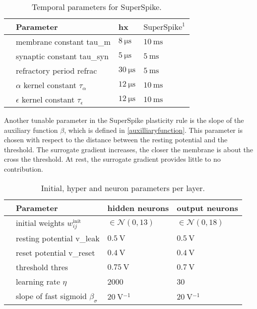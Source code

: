 \begin{table}[t!]\centering{}
	\begin{tabular}{@{}rlll@{}}\toprule
		& Parameter		& 	\gls{hx} & 	$\text{SuperSpike}^1$ \\ \midrule
		& membrane constant \gls{tau_m}		& 	$\SI{8}{\micro \s}$ & 	$\SI{10}{\milli \s}$\\
		& synaptic constant \gls{tau_syn}	&	$\SI{5}{\micro \s}$ & 	$\SI{5}{\milli \s}$\\
		& refractory period \gls{refrac}	&	$\SI{30}{\micro \s}$ & 	$\SI{5}{\milli \s}$\\
		& $\alpha$ kernel constant $\tau_\alpha$	&	$\SI{12}{\micro \s}$& 	$\SI{10}{\milli \s}$\\
		& $\epsilon$ kernel constant $\tau_\epsilon$ 	&	$\SI{12}{\micro \s}$& 	$\SI{10}{\milli \s}$\\
		\bottomrule
	\end{tabular}
	\caption[Temporal parameters for SuperSpike.]{Temporal parameters for SuperSpike.}
	\label{temporalconstants}
\end{table}

Another tunable parameter in the SuperSpike plasticity rule is the slope of the auxiliary function $\beta$, which is defined in \cref{auxilliaryfunction}. This parameter is chosen with respect to the distance between the resting potential and the threshold. The surrogate gradient increases, the closer the membrane is about the cross the threshold. At rest, the surrogate gradient provides little to no contribution. 

\begin{table}\centering{}
	\begin{tabular}{@{}rlll@{}}\toprule
		& Parameter								& 	hidden neurons 			& 	output neurons \\ \midrule
		& initial weights $w_{ij}^\text{init}$	& 	$\in \mathcal{N}(0,13)$ & 	$\in \mathcal{N}(0,18)$\\
		& resting potential \gls{v_leak}		&	$\SI{0.5}{\V}$ 			& 	$\SI{0.5}{\V}$\\
		& reset potential \gls{v_reset}			&	$\SI{0.4}{\V}$			& 	$\SI{0.4}{\V}$\\
		& threshold \gls{thres} 				&	$\SI{0.75}{\V}$			& 	$\SI{0.7}{\V}$\\
		& learning rate $\eta$ 					&	2000					& 	30			\\
		& slope of fast sigmoid $\beta_\sigma$ 	&	$\SI{20}{\V^{-1}}$		& 	$\SI{20}{\V^{-1}}$	\\
		\bottomrule
	\end{tabular}
	\caption[Initial, hyper and neuron parameters per layer.]{Initial, hyper and neuron parameters per layer.}
	\label{initparameters}
\end{table}

